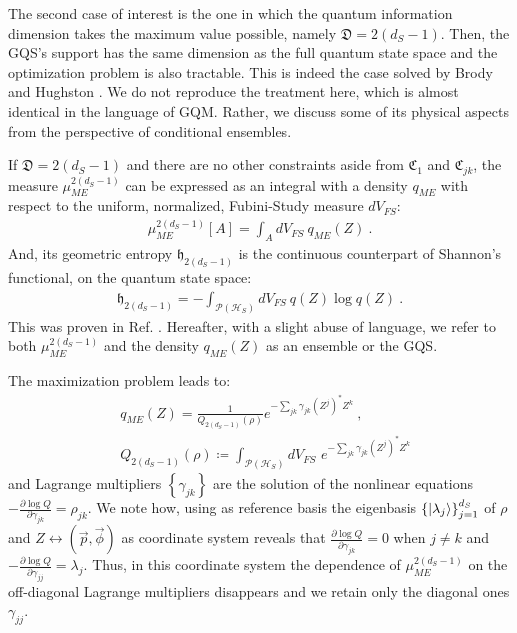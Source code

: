 \documentclass[draft,nofootinbib,pre,twocolumn,showpacs,showkeys,groupaddress,preprintnumbers,floatfix]{revtex4-1}
\newcommand{\1}{\mathbbm{1}}
\newcommand{\ID}{\mathfrak{D}}
\begin{document}
The second case of interest is the one in which the quantum information dimension takes 
the maximum value possible, namely $\ID = 2(d_S-1)$. Then, the GQS's support has
the same dimension as the full quantum state space and the optimization problem
is also tractable. This is indeed the case solved by Brody and Hughston
\cite{Brody2000}. We do not reproduce the treatment here, which is almost
identical in the language of GQM. Rather, we discuss some of its physical
aspects from the perspective of conditional ensembles.

If $\ID = 2(d_S - 1)$ and there are no other constraints aside from
$\mathfrak{C}_1$ and $\mathfrak{C}_{jk}$, the measure $\mu_{ME}^{2(d_S-1)}$ can
be expressed as an integral with a density $q_{ME}$ with respect to the
uniform, normalized, Fubini-Study measure $dV_{FS}$:
\begin{align*}
\mu_{ME}^{2(d_S-1)}[A] = \int_A \!\! dV_{FS}~q_{ME}(Z)
  ~.
\end{align*}
And, its geometric entropy $\mathfrak{h}_{2(d_S-1)}$ is the continuous counterpart of Shannon's functional, on the quantum state space:
\begin{align*}
\mathfrak{h}_{2(d_S-1)} = -\int_{\mathcal{P}(\mathcal{H}_S)}\!\!\!\!\!\! dV_{FS}~q(Z) \log q(Z)
  ~.
\end{align*}
This was proven in Ref. \cite{Anza22a}. Hereafter, with a slight abuse of
language, we refer to both $\mu_{ME}^{2(d_S-1)}$ and the density $q_{ME}(Z)$ as
an ensemble or the GQS.

The maximization problem leads to:
\begin{align*}
& q_{ME}(Z) = \frac{1}{Q_{2(d_S-1)}(\rho)}e^{-\sum_{jk}\gamma_{jk} (Z^{j})^{*}Z^k}~,\label{eq:me_max_D}\\
& Q_{2(d_S-1)}(\rho) \coloneqq \int_{\mathcal{P}(\mathcal{H}_S)}\!\!\!\!\!\! dV_{FS} \,\,  e^{-\sum_{jk}\gamma_{jk} (Z^{j})^{*}Z^k}
\end{align*}
and Lagrange multipliers $\left\{ \gamma_{jk}\right\}$ are the solution of the nonlinear equations $-\frac{\partial \log Q}{\partial \gamma_{jk}} = \rho_{jk}$.
We note how, using as reference basis the eigenbasis $\left\{\ket{\lambda_j}\right\}_{j=1}^{d_S}$ of $\rho$ and $Z \leftrightarrow (\vec{p},\vec{\phi})$ as coordinate system
reveals that $\frac{\partial \log Q}{\partial \gamma_{jk}} = 0$ when $j\neq k$ and $-\frac{\partial \log Q}{\partial \gamma_{jj}}=\lambda_j$. Thus, in this coordinate system
the dependence of $\mu_{ME}^{2(d_S-1)}$ on the off-diagonal Lagrange multipliers disappears and we retain only the diagonal ones $\gamma_{jj}$. 
\end{document}
